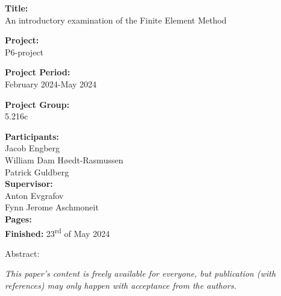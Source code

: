 \begin{minipage}[t]{0.48\textwidth}
\textbf{Title:} \\[5pt]\hspace{2ex}
{An introductory examination of the Finite Element Method}
\bigskip

\textbf{Project:} \\[5pt]\hspace{2ex}
P6-project
\bigskip

\textbf{Project Period:} \\[5pt]\hspace{2ex}
February 2024-May 2024
\bigskip

\textbf{Project Group:} \\[5pt]\hspace{2ex}
5.216c
\bigskip

\textbf{Participants:} \\ [5pt]\hspace{2ex}%
Jacob Engberg \\%
William Dam Høedt-Rasmussen\\%
Patrick Guldberg \\%

\textbf{Supervisor:} \\ [5pt]\hspace{2ex}%
Anton Evgrafov \\
Fynn Jerome Aschmoneit \\

\textbf{Pages:~\pageref{LastPage}} \\ [5pt]\hspace{2ex}
\textbf{Finished:} 23\textsuperscript{rd} of May 2024

\end{minipage}
\hfill
\begin{minipage}[t]{0.48\textwidth}
Abstract: \\[5pt]
\fbox{\parbox{6.8cm}{\bigskip}}
\end{minipage}
\hspace*{4ex}

\vfill

{\footnotesize \textit{This paper's content is freely available for everyone, but publication (with references) may only happen with acceptance from the authors.}}